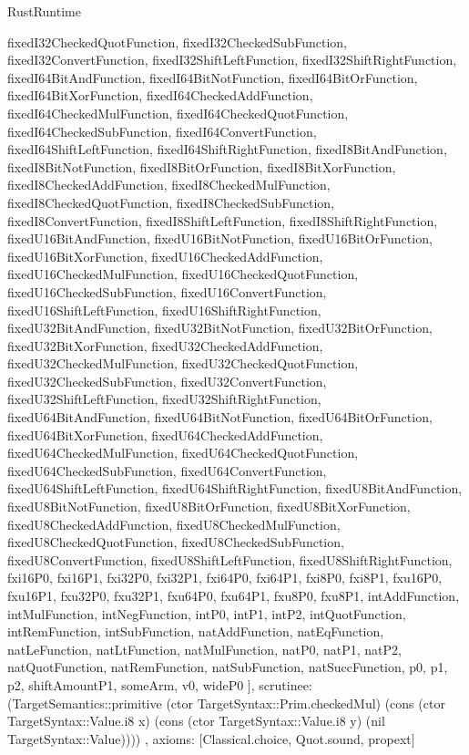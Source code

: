 \begin{lexlean}{RustRuntime}
\begin{semanticmodule}
{{      fixedI32CheckedQuotFunction,
      fixedI32CheckedSubFunction,
      fixedI32ConvertFunction,
      fixedI32ShiftLeftFunction,
      fixedI32ShiftRightFunction,
      fixedI64BitAndFunction,
      fixedI64BitNotFunction,
      fixedI64BitOrFunction,
      fixedI64BitXorFunction,
      fixedI64CheckedAddFunction,
      fixedI64CheckedMulFunction,
      fixedI64CheckedQuotFunction,
      fixedI64CheckedSubFunction,
      fixedI64ConvertFunction,
      fixedI64ShiftLeftFunction,
      fixedI64ShiftRightFunction,
      fixedI8BitAndFunction,
      fixedI8BitNotFunction,
      fixedI8BitOrFunction,
      fixedI8BitXorFunction,
      fixedI8CheckedAddFunction,
      fixedI8CheckedMulFunction,
      fixedI8CheckedQuotFunction,
      fixedI8CheckedSubFunction,
      fixedI8ConvertFunction,
      fixedI8ShiftLeftFunction,
      fixedI8ShiftRightFunction,
      fixedU16BitAndFunction,
      fixedU16BitNotFunction,
      fixedU16BitOrFunction,
      fixedU16BitXorFunction,
      fixedU16CheckedAddFunction,
      fixedU16CheckedMulFunction,
      fixedU16CheckedQuotFunction,
      fixedU16CheckedSubFunction,
      fixedU16ConvertFunction,
      fixedU16ShiftLeftFunction,
      fixedU16ShiftRightFunction,
      fixedU32BitAndFunction,
      fixedU32BitNotFunction,
      fixedU32BitOrFunction,
      fixedU32BitXorFunction,
      fixedU32CheckedAddFunction,
      fixedU32CheckedMulFunction,
      fixedU32CheckedQuotFunction,
      fixedU32CheckedSubFunction,
      fixedU32ConvertFunction,
      fixedU32ShiftLeftFunction,
      fixedU32ShiftRightFunction,
      fixedU64BitAndFunction,
      fixedU64BitNotFunction,
      fixedU64BitOrFunction,
      fixedU64BitXorFunction,
      fixedU64CheckedAddFunction,
      fixedU64CheckedMulFunction,
      fixedU64CheckedQuotFunction,
      fixedU64CheckedSubFunction,
      fixedU64ConvertFunction,
      fixedU64ShiftLeftFunction,
      fixedU64ShiftRightFunction,
      fixedU8BitAndFunction,
      fixedU8BitNotFunction,
      fixedU8BitOrFunction,
      fixedU8BitXorFunction,
      fixedU8CheckedAddFunction,
      fixedU8CheckedMulFunction,
      fixedU8CheckedQuotFunction,
      fixedU8CheckedSubFunction,
      fixedU8ConvertFunction,
      fixedU8ShiftLeftFunction,
      fixedU8ShiftRightFunction,
      fxi16P0,
      fxi16P1,
      fxi32P0,
      fxi32P1,
      fxi64P0,
      fxi64P1,
      fxi8P0,
      fxi8P1,
      fxu16P0,
      fxu16P1,
      fxu32P0,
      fxu32P1,
      fxu64P0,
      fxu64P1,
      fxu8P0,
      fxu8P1,
      intAddFunction,
      intMulFunction,
      intNegFunction,
      intP0,
      intP1,
      intP2,
      intQuotFunction,
      intRemFunction,
      intSubFunction,
      natAddFunction,
      natEqFunction,
      natLeFunction,
      natLtFunction,
      natMulFunction,
      natP0,
      natP1,
      natP2,
      natQuotFunction,
      natRemFunction,
      natSubFunction,
      natSuccFunction,
      p0,
      p1,
      p2,
      shiftAmountP1,
      someArm,
      v0,
      wideP0
    ],
    scrutinee: (TargetSemantics::primitive (ctor TargetSyntax::Prim.checkedMul) (cons (ctor TargetSyntax::Value.i8 x) (cons (ctor TargetSyntax::Value.i8 y) (nil TargetSyntax::Value))))
  },
  axioms: [Classical.choice, Quot.sound, propext]
}


\end{semanticmodule}
\end{lexlean}
